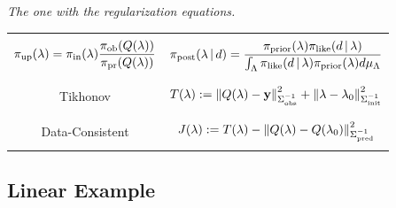 \begin{frame}{\it The one with the regularization equations.}

\begin{table}[htbp]
\centering

\begin{tabular}{|c|c|}
\hline
  & \\
  $\displaystyle \operatorname*{\pi_{up}}(\lambda) = \operatorname*{\pi_{in}}(\lambda) \frac{\operatorname*{\pi_{ob}}(Q(\lambda))}{\operatorname*{\pi_{pr}}(Q(\lambda))}$
&
  $\displaystyle \pi_{\text{post}}(\lambda\,|\,d) = \frac{\pi_{\text{prior}}(\lambda)\pi_\text{like}(d\,|\,\lambda)}{\int_{\Lambda} \pi_\text{like}(d\, |\, \lambda)  \pi_{\text{prior}}(\lambda) d\mu_{{\Lambda}}}$
\\ \\
\hline
  & \\
  Tikhonov & $T(\lambda):=\left\Vert Q(\lambda)-\mathbf{y}\right\Vert_{\Sigma_\text{obs}^{-1}}^2 +
      \left\Vert\lambda-\lambda_0\right\Vert_{\Sigma_\text{init}^{-1}}^2$
  \\ & \\ \hline & \\
  Data-Consistent & $J(\lambda):=T(\lambda) - \left\Vert Q(\lambda)-Q(\lambda_0)\right\Vert_{\Sigma_\text{pred}^{-1}}^2$
\\
& \\
  \hline
\end{tabular}
%
%
  \label{tab:func_comparisons}
\end{table}


\end{frame}



\subsection{Linear Example}

